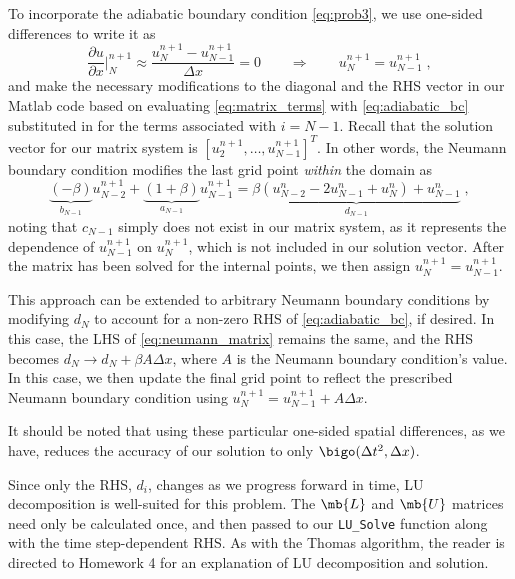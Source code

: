 \documentclass[11pt]{article}
\begin{document}
To incorporate the adiabatic boundary condition \eqref{eq:prob3}, we use one-sided differences to write it as
\begin{equation}
\frac{\partial u}{\partial x} \Big|_N^{n+1} \approx \frac{u_N^{n+1} - u_{N-1}^{n+1}}{\Delta x} = 0
\qquad \Rightarrow \qquad
u_N^{n+1} = u_{N-1}^{n+1}
\;,
\label{eq:adiabatic_bc}
\end{equation}
and make the necessary modifications to the diagonal and the RHS vector in our Matlab code based on evaluating \eqref{eq:matrix_terms} with \eqref{eq:adiabatic_bc} substituted in for the terms associated with $i=N-1$. Recall that the solution vector for our matrix system is $[ u_2^{n+1}, \dots, u_{N-1}^{n+1} ]^T$. In other words, the Neumann boundary condition modifies the last grid point \emph{within} the domain as
\begin{equation}
  \underbrace{\left(      -\beta \right)}_{b_{N-1}} u_{N-2}^{n+1}
+ \underbrace{\left( 1 +   \beta \right)}_{a_{N-1}} u_{N-1}^{n+1}
=
\underbrace{\beta \left( u_{N-2}^n - 2 u_{N-1}^n + u_{N}^n \right) + u_{N-1}^n}_{d_{N-1}}
\;,
\label{eq:neumann_matrix}
\end{equation}
noting that $c_{N-1}$ simply does not exist in our matrix system, as it represents the dependence of $u_{N-1}^{n+1}$ on $u_N^{n+1}$, which is not included in our solution vector. After the matrix has been solved for the internal points, we then assign $u_N^{n+1} = u_{N-1}^{n+1}$.

This approach can be extended to arbitrary Neumann boundary conditions by modifying $d_N$ to account for a non-zero RHS of \eqref{eq:adiabatic_bc}, if desired. In this case, the LHS of \eqref{eq:neumann_matrix} remains the same, and the RHS becomes $d_N \rightarrow d_N + \beta A \Delta x$, where $A$ is the Neumann boundary condition's value. In this case, we then update the final grid point to reflect the prescribed Neumann boundary condition using $u_N^{n+1} = u_{N-1}^{n+1} + A  \Delta x$.

It should be noted that using these particular one-sided spatial differences, as we have, reduces the accuracy of our solution to only $\bigo(\Delta t^2, \Delta x)$.

Since only the RHS, $d_i$, changes as we progress forward in time, LU decomposition is well-suited for this problem. The $\mb{L}$ and $\mb{U}$ matrices need only be calculated once, and then passed to our \lstinline|LU_Solve| function along with the time step-dependent RHS. As with the Thomas algorithm, the reader is directed to Homework 4 for an explanation of LU decomposition and solution.
\end{document}
